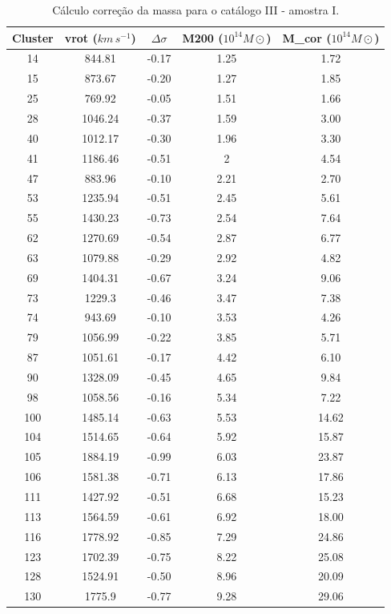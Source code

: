 {\small
\begin{longtable}{ccccc}
\caption{Cálculo correção da massa para o catálogo III - amostra I.}
\label{tab:massamostrai}
\\ \hline
\textbf{Cluster} & \textbf{vrot ($km \, s^{-1}$)} & \textbf{$\Delta \sigma$} &\textbf{M200 ($10^{14}  M\odot$)} & \textbf{M_{cor} ($10^{14}  M\odot$)}\\ \hline
14 & 844.81 & -0.17 & 1.25 & 1.72 \\
15 & 873.67 & -0.20 & 1.27 & 1.85 \\
25 & 769.92 & -0.05 & 1.51 & 1.66 \\
28 & 1046.24 & -0.37 & 1.59 & 3.00 \\
40 & 1012.17 & -0.30 & 1.96 & 3.30 \\
41 & 1186.46 & -0.51 & 2 & 4.54 \\
47 & 883.96 & -0.10 & 2.21 & 2.70 \\
53 & 1235.94 & -0.51 & 2.45 & 5.61 \\
55 & 1430.23 & -0.73 & 2.54 & 7.64 \\
62 & 1270.69 & -0.54 & 2.87 & 6.77 \\
63 & 1079.88 & -0.29 & 2.92 & 4.82 \\
69 & 1404.31 & -0.67 & 3.24 & 9.06 \\
73 & 1229.3 & -0.46 & 3.47 & 7.38 \\
74 & 943.69 & -0.10 & 3.53 & 4.26 \\
79 & 1056.99 & -0.22 & 3.85 & 5.71 \\
87 & 1051.61 & -0.17 & 4.42 & 6.10 \\
90 & 1328.09 & -0.45 & 4.65 & 9.84 \\
98 & 1058.56 & -0.16 & 5.34 & 7.22 \\
100 & 1485.14 & -0.63 & 5.53 & 14.62 \\
104 & 1514.65 & -0.64 & 5.92 & 15.87 \\
105 & 1884.19 & -0.99 & 6.03 & 23.87 \\
106 & 1581.38 & -0.71 & 6.13 & 17.86 \\
111 & 1427.92 & -0.51 & 6.68 & 15.23 \\
113 & 1564.59 & -0.61 & 6.92 & 18.00 \\
116 & 1778.92 & -0.85 & 7.29 & 24.86 \\
123 & 1702.39 & -0.75 & 8.22 & 25.08 \\
128 & 1524.91 & -0.50 & 8.96 & 20.09 \\
130 & 1775.9 & -0.77 & 9.28 & 29.06 \\

\end{longtable}}
